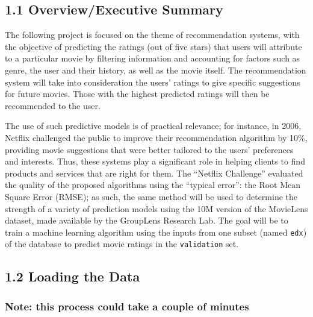 \documentclass[]{article}
\begin{document}
\hypertarget{overviewexecutive-summary-1}{%
\subsection{1.1 Overview/Executive
Summary}\label{overviewexecutive-summary-1}}

The following project is focused on the theme of recommendation systems,
with the objective of predicting the ratings (out of five stars) that
users will attribute to a particular movie by filtering information and
accounting for factors such as genre, the user and their history, as
well as the movie itself. The recommendation system will take into
consideration the users' ratings to give specific suggestions for future
movies. Those with the highest predicted ratings will then be
recommended to the user.

The use of such predictive models is of practical relevance; for
instance, in 2006, Netflix challenged the public to improve their
recommendation algorithm by 10\%, providing movie suggestions that were
better tailored to the users' preferences and interests. Thus, these
systems play a significant role in helping clients to find products and
services that are right for them. The ``Netflix Challenge'' evaluated
the quality of the proposed algorithms using the ``typical error'': the
Root Mean Square Error (RMSE); as such, the same method will be used to
determine the strength of a variety of prediction models using the 10M
version of the MovieLens dataset, made available by the GroupLens
Research Lab. The goal will be to train a machine learning algorithm
using the inputs from one subset (named \texttt{edx}) of the database to
predict movie ratings in the \texttt{validation} set.

\hypertarget{loading-the-data-1}{%
\subsection{1.2 Loading the Data}\label{loading-the-data-1}}

\hypertarget{note-this-process-could-take-a-couple-of-minutes}{%
\subsubsection{Note: this process could take a couple of
minutes}\label{note-this-process-could-take-a-couple-of-minutes}}
\end{document}
